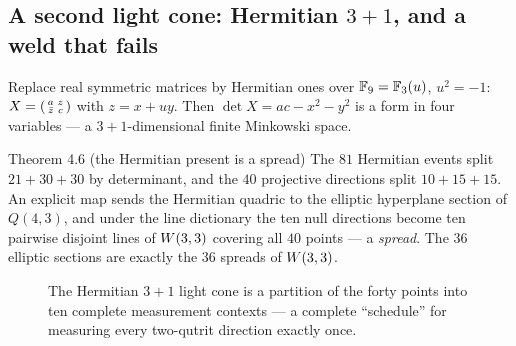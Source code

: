 \subsection{A second light cone: Hermitian $3+1$, and a weld that fails}

Replace real symmetric matrices by Hermitian ones over $\mathbb{F}_9=\mathbb{F}_3(u)$, $u^2=-1$:
$X=\begin{psmallmatrix} a&z\\ \bar z&c\end{psmallmatrix}$ with $z=x+uy$. Then
$\det X=ac-x^2-y^2$ is a form in four variables --- a $3+1$-dimensional finite Minkowski
space.

\begin{result}{Theorem 4.6 (the Hermitian present is a spread) \hfill \tierC}
The $81$ Hermitian events split $21+30+30$ by determinant, and the $40$ projective
directions split $10+15+15$. An explicit map sends the Hermitian quadric to the elliptic
hyperplane section of $Q(4,3)$, and under the line dictionary the ten null directions
become ten pairwise disjoint lines of $W(3,3)$ covering all $40$ points --- a \emph{spread}.
The $36$ elliptic sections are exactly the $36$ spreads of $W(3,3)$.
\end{result}

\begin{figure}[htbp]
\centering
{}
\caption{The Hermitian $3+1$ light cone is a partition of the forty points into ten
complete measurement contexts --- a complete ``schedule'' for measuring every
two-qutrit direction exactly once.}
\label{fig:spread}
\end{figure}


